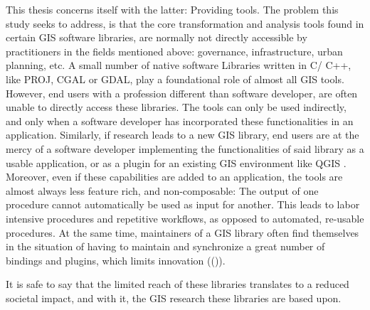 This thesis concerns itself with the latter: Providing tools. 
The problem this study seeks to address, is that the core transformation and analysis tools found in certain \ac{GIS} software libraries, are normally not directly accessible by practitioners in the fields mentioned above: governance, infrastructure, urban planning, etc.
A small number of native software Libraries written in C/ C++, like PROJ, CGAL or GDAL, play a foundational role of almost all \ac{GIS} tools. 
However, end users with a profession different than software developer, are often unable to directly access these libraries. 
The tools can only be used indirectly, and only when a software developer has incorporated these functionalities in an application. 
Similarly, if research leads to a new \ac{GIS} library, end users are at the mercy of a software developer implementing the functionalities of said library as a usable application, or as a plugin for an existing \ac{GIS} environment like QGIS \citep*{qgis_community_qgis_2022}.
Moreover, even if these capabilities are added to an application, the tools are almost always less feature rich, and non-composable: The output of one procedure cannot automatically be used as input for another. This leads to labor intensive procedures and repetitive workflows, as opposed to automated, re-usable procedures.
At the same time, maintainers of a \ac{GIS} library often find themselves in the situation of having to maintain and synchronize a great number of bindings and plugins, which limits innovation (()).

It is safe to say that the limited reach of these libraries translates to a reduced societal impact, and with it, the \ac{GIS} research these libraries are based upon.


